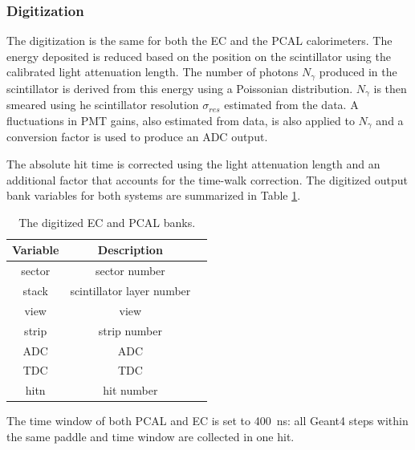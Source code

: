 
\subsubsection{Digitization}
The digitization is the same for both the EC and the PCAL calorimeters.
The energy deposited is reduced based on the position on the scintillator using the calibrated light attenuation length.
The number of photons $N_\gamma$ produced in the scintillator is derived from this energy using a Poissonian distribution.
$N_\gamma$ is then smeared using he scintillator resolution $\sigma_{res}$ estimated from the data.
A fluctuations in PMT gains, also estimated from data, is also applied to $N_\gamma$ and a
conversion factor is used to produce an ADC output.

The absolute hit time is corrected using the light attenuation length and an additional factor
that accounts for the time-walk correction.
The digitized output bank variables for both systems are summarized in Table \ref{tab:ecBank}.

\begin{table}[h]
	\begin{center}
		\begin{tabular}{| c | c | c |}
			\hline \hline
			Variable &                Description   \\
			\hline
             sector  &              sector number   \\
              stack  &  scintillator layer number   \\
               view  &                       view   \\
              strip  &               strip number   \\
                ADC  &                        ADC   \\
                TDC  &                        TDC   \\
               hitn  &                 hit number   \\
			\hline \hline
		\end{tabular}
	\end{center}
	\caption{The digitized EC and PCAL banks.}\label{tab:ecBank}
\end{table}


The time window of both PCAL and EC is set to 400~ns: all Geant4 steps within the same paddle
and time window are collected in one hit.
